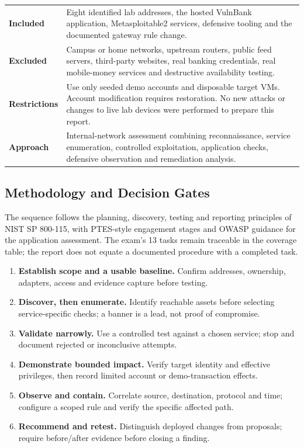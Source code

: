 \documentclass[11pt,a4paper]{article}
\begin{document}
\begin{tabularx}{\linewidth}{@{}L{3.3cm}X@{}}
\toprule
\textbf{Included} & Eight identified lab addresses, the hosted VulnBank application, Metasploitable2 services, defensive tooling and the documented gateway rule change.\\
\textbf{Excluded} & Campus or home networks, upstream routers, public feed servers, third-party websites, real banking credentials, real mobile-money services and destructive availability testing.\\
\textbf{Restrictions} & Use only seeded demo accounts and disposable target VMs. Account modification requires restoration. No new attacks or changes to live lab devices were performed to prepare this report.\\
\textbf{Approach} & Internal-network assessment combining reconnaissance, service enumeration, controlled exploitation, application checks, defensive observation and remediation analysis.\\
\bottomrule
\end{tabularx}

\subsection{Methodology and Decision Gates}
The sequence follows the planning, discovery, testing and reporting principles of NIST SP 800-115, with PTES-style engagement stages and OWASP guidance for the application assessment. The exam's 13 tasks remain traceable in the coverage table; the report does not equate a documented procedure with a completed task.
\begin{enumerate}
\item \textbf{Establish scope and a usable baseline.} Confirm addresses, ownership, adapters, access and evidence capture before testing.
\item \textbf{Discover, then enumerate.} Identify reachable assets before selecting service-specific checks; a banner is a lead, not proof of compromise.
\item \textbf{Validate narrowly.} Use a controlled test against a chosen service; stop and document rejected or inconclusive attempts.
\item \textbf{Demonstrate bounded impact.} Verify target identity and effective privileges, then record limited account or demo-transaction effects.
\item \textbf{Observe and contain.} Correlate source, destination, protocol and time; configure a scoped rule and verify the specific affected path.
\item \textbf{Recommend and retest.} Distinguish deployed changes from proposals; require before/after evidence before closing a finding.
\end{enumerate}
\end{document}
